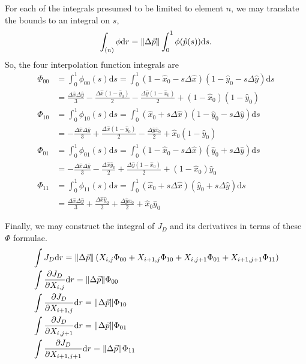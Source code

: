 For each of the integrals presumed to be limited to element $n$, we may translate the bounds to an integral on $s$,
\begin{align}
\int_{(n)} \phi \mathrm{d}r = \|\Delta\vec{p}\| \int_0^1 \phi(\hat{p}(s)) \mathrm{d} s.
\end{align}
So, the four interpolation function integrals are
\begin{subequations}
\begin{align}
\Phi_{00} &= \int_0^1 \phi_{00}(s) \mathrm{d}s = \int_0^1 (1-\hat{x}_0 - s\Delta\hat{x})(1-\hat{y}_0-s\Delta\hat{y})\mathrm{d}s\nonumber\\
 &= \frac{\Delta \hat{x} \Delta \hat{y}}{3} - \frac{\Delta \hat{x} (1-\hat{y}_0)}{2} - \frac{\Delta \hat{y} (1-\hat{x}_0)}{2} + (1-\hat{x}_0)(1-\hat{y}_0)\\
\Phi_{10} &= \int_0^1 \phi_{10}(s) \mathrm{d}s = \int_0^1 (\hat{x}_0 + s\Delta\hat{x})(1-\hat{y}_0-s\Delta\hat{y})\mathrm{d}s\nonumber\\
 &= -\frac{\Delta \hat{x} \Delta \hat{y}}{3} + \frac{\Delta \hat{x} (1-\hat{y}_0)}{2} - \frac{\Delta \hat{y} \hat{x}_0}{2} + \hat{x}_0(1-\hat{y}_0)\\
\Phi_{01} &= \int_0^1 \phi_{01}(s) \mathrm{d}s = \int_0^1 (1 - \hat{x}_0 - s\Delta\hat{x})(\hat{y}_0+s\Delta\hat{y})\mathrm{d}s\nonumber\\
 &= -\frac{\Delta \hat{x} \Delta \hat{y}}{3} - \frac{\Delta \hat{x} \hat{y}_0}{2} + \frac{\Delta \hat{y} (1-\hat{x}_0)}{2} + (1-\hat{x}_0)\hat{y}_0\\
\Phi_{11} &= \int_0^1 \phi_{11}(s) \mathrm{d}s = \int_0^1 (\hat{x}_0 + s\Delta\hat{x})(\hat{y}_0+s\Delta\hat{y})\mathrm{d}s\nonumber\\
 &= \frac{\Delta \hat{x} \Delta \hat{y}}{3} + \frac{\Delta \hat{x} \hat{y}_0}{2} + \frac{\Delta \hat{y} x_0}{2} + \hat{x}_0 \hat{y}_0
\end{align}
\end{subequations}

Finally, we may construct the integral of $J_D$ and its derivatives in terms of these $\Phi$ formulae.
\begin{subequations}\label{eqn:JDPhi:all}
\begin{align}
&\int J_D \mathrm{d}r = \|\Delta \vec{p}\| \left( X_{i,j} \Phi_{00} + X_{i+1,j} \Phi_{10} + X_{i,j+1} \Phi_{01} + X_{i+1,j+1} \Phi_{11} \right)\\
&\int \frac{\partial J_D}{\partial X_{i,j}} \mathrm{d} r = \|\Delta \vec{p}\| \Phi_{00}\\
&\int \frac{\partial J_D}{\partial X_{i+1,j}} \mathrm{d} r = \|\Delta \vec{p}\| \Phi_{10}\\
&\int \frac{\partial J_D}{\partial X_{i,j+1}} \mathrm{d} r = \|\Delta \vec{p}\| \Phi_{01}\\
&\int \frac{\partial J_D}{\partial X_{i+1,j+1}} \mathrm{d} r = \|\Delta \vec{p}\| \Phi_{11}
\end{align}
\end{subequations}

